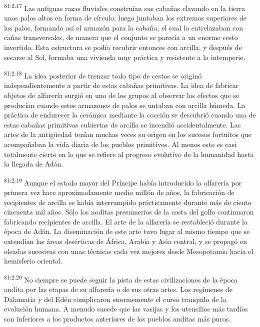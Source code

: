 \par
\textsuperscript{81:2.17} Las antiguas razas fluviales construían sus cabañas clavando en la tierra unos palos altos en forma de círculo; luego juntaban los extremos superiores de los palos, formando así el armazón para la cabaña, el cual lo entrelazaban con cañas transversales, de manera que el conjunto se parecía a un enorme cesto invertido. Esta estructura se podía recubrir entonces con arcilla, y después de secarse al Sol, formaba una vivienda muy práctica y resistente a la intemperie.

\par
\textsuperscript{81:2.18} La idea posterior de trenzar todo tipo de cestos se originó independientemente a partir de estas cabañas primitivas. La idea de fabricar objetos de alfarería surgió en uno de los grupos al observar los efectos que se producían cuando estos armazones de palos se untaban con arcilla húmeda. La práctica de endurecer la cerámica mediante la cocción se descubrió cuando una de estas cabañas primitivas cubiertas de arcilla se incendió accidentalmente. Las artes de la antig\"uedad tenían muchas veces su origen en los sucesos fortuitos que acompañaban la vida diaria de los pueblos primitivos. Al menos esto es casi totalmente cierto en lo que se refiere al progreso evolutivo de la humanidad hasta la llegada de Adán.

\par
\textsuperscript{81:2.19} Aunque el estado mayor del Príncipe había introducido la alfarería por primera vez hace aproximadamente medio millón de años, la fabricación de recipientes de arcilla se había interrumpido prácticamente durante más de ciento cincuenta mil años. Sólo los noditas presumerios de la costa del golfo continuaron fabricando recipientes de arcilla. El arte de la alfarería se restableció durante la época de Adán. La diseminación de este arte tuvo lugar al mismo tiempo que se extendían las áreas desérticas de África, Arabia y Asia central, y se propagó en oleadas sucesivas con unas técnicas cada vez mejores desde Mesopotamia hacia el hemisferio oriental.

\par
\textsuperscript{81:2.20} No siempre se puede seguir la pista de estas civilizaciones de la época andita por las etapas de su alfarería o de sus otras artes. Los regímenes de Dalamatia y del Edén complicaron enormemente el curso tranquilo de la evolución humana. A menudo sucede que las vasijas y los utensilios más tardíos son inferiores a los productos anteriores de los pueblos anditas más puros.


